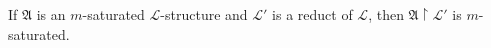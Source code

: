 If $\mathfrak{A}$ is an $m$-saturated $\mathcal{L}$-structure and $\mathcal{L}'$ is a reduct of $\mathcal{L}$, then $\mathfrak{A} \upharpoonright \mathcal{L}'$ is $m$-saturated.
